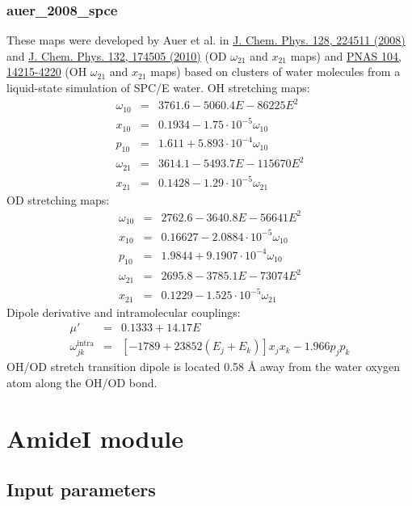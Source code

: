 \documentclass{article}
\begin{document}
\subsubsection{auer\_2008\_spce}
These maps were developed by  Auer et al. in \href{https://doi.org/10.1063/1.2925258}{J. Chem. Phys. 128, 224511 (2008)} 
and \href{http://dx.doi.org/10.1063/1.3409561}{J. Chem. Phys. 132, 174505 (2010)} (OD $\omega_{21}$ and $x_{21}$ maps)
and \href{http://www.pnas.org/cgi/doi/10.1073/pnas.0701482104}{PNAS 104, 14215-4220} (OH $\omega_{21}$ and $x_{21}$ maps)
based on clusters
of water molecules from a liquid-state simulation of SPC/E water. OH stretching maps:
\begin{eqnarray}
\omega_{10} &=& 3761.6 - 5060.4 E - 86225 E^2\nonumber\\
x_{10} &=& 0.1934 - 1.75\cdot 10^{-5} \omega_{10} \nonumber \\
p_{10} &=& 1.611 + 5.893\cdot 10^{-4} \omega_{10} \nonumber \\
\omega_{21} &=& 3614.1 - 5493.7E-115670 E^2 \nonumber \\
x_{21} &=& 0.1428 - 1.29\cdot 10^{-5} \omega_{21} \nonumber 
\end{eqnarray}
OD stretching maps:
\begin{eqnarray}
\omega_{10} &=& 2762.6 - 3640.8E-56641 E^2 \nonumber\\
x_{10} &=& 0.16627 - 2.0884\cdot 10^{-5} \omega_{10} \nonumber \\
p_{10} &=& 1.9844 + 9.1907\cdot 10^{-4} \omega_{10} \nonumber \\
\omega_{21} &=& 2695.8 - 3785.1E-73074 E^2 \nonumber \\
x_{21} &=& 0.1229 - 1.525\cdot 10^{-5} \omega_{21} \nonumber 
\end{eqnarray}
Dipole derivative and intramolecular couplings:
\begin{eqnarray}
\mu' &=& 0.1333 + 14.17E \nonumber \\
\omega_{jk}^\text{intra}&=& [-1789 + 23852(E_j + E_k)]x_jx_k - 1.966 p_j p_k \nonumber
\end{eqnarray}
OH/OD stretch transition dipole is located 0.58 \AA{} away from the water oxygen atom along the OH/OD bond.

%
%
\section{AmideI module}
\subsection{Input parameters}
\end{document}
